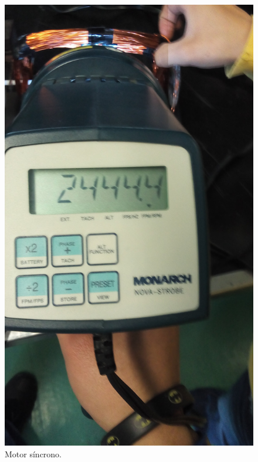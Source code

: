 \begin{figure}[!htbp]
\caption{Motor s\'incrono.}
\centering
\includegraphics [scale=0.05, angle=-90]
{./img/20160308_131835.jpg}
\end{figure}


 \pagebreak